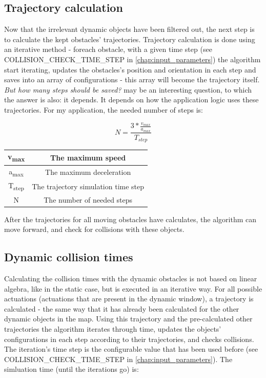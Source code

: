 \subsection{Trajectory calculation}
\label{trajectory_calculation}
Now that the irrelevant dynamic objects have been filtered out, the next step is to calculate the kept obstacles' trajectories. Trajectory calculation is done using an iterative method - foreach obstacle, with a given time step (see COLLISION\_CHECK\_TIME\_STEP in \ref{chap:input_parameters}) the algorithm start iterating, updates the obstacles's position and orientation in each step and saves into an array of configurations - this array will become the trajectory itself. \textit{But how many steps should be saved?} may be an interesting question, to which the answer is also: it depends. It depends on how the application logic uses these trajectories. For my application, the needed number of steps is:

\[ N = \frac{3 * \frac{v_{max}}{a_{max}}}{T_{step}} \]

\begin{center}
    \begin{tabular}{ | c | c | }
        \hline
        v\textsubscript{max}	& The maximum speed    					\\
        \hline
        a\textsubscript{max}  	& The maximum deceleration      		\\
        \hline
        T\textsubscript{step}  	& The trajectory simulation time step	\\
        \hline
        N  						& The number of needed steps			\\
        \hline
    \end{tabular}
\end{center}

After the trajectories for all moving obstacles have calculates, the algorithm can move forward, and check for collisions with these objects.

\subsection{Dynamic collision times}
Calculating the collision times with the dynamic obstacles is not based on linear algebra, like in the static case, but is executed in an iterative way. For all possible actuations (actuations that are present in the dynamic window), a trajectory is calculated - the same way that it has already been calculated for the other dynamic objects in the map. Using this trajectory and the pre-calculated other trajectories the algorithm iterates through time, updates the objects' configurations in each step according to their trajectories, and checks collisions. The iteration's time step is the configurable value that has been used before (see COLLISION\_CHECK\_TIME\_STEP in \ref{chap:input_parameters}). The simluation time (until the iterations go) is:

